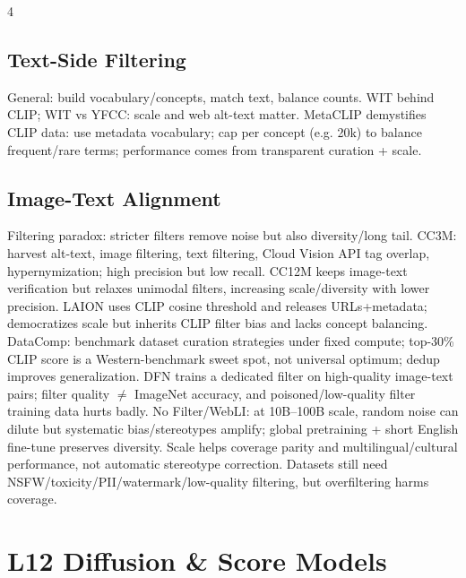 \documentclass[8pt,a4paper,landscape]{extarticle}
\begin{document}
\begin{multicols*}{4}
\subsection{Text-Side Filtering}
General: build vocabulary/concepts, match text, balance counts. WIT behind CLIP; WIT vs YFCC: scale and web alt-text matter. MetaCLIP demystifies CLIP data: use metadata vocabulary; cap per concept (e.g. 20k) to balance frequent/rare terms; performance comes from transparent curation + scale.
\subsection{Image-Text Alignment}
Filtering paradox: stricter filters remove noise but also diversity/long tail. CC3M: harvest alt-text, image filtering, text filtering, Cloud Vision API tag overlap, hypernymization; high precision but low recall. CC12M keeps image-text verification but relaxes unimodal filters, increasing scale/diversity with lower precision. LAION uses CLIP cosine threshold and releases URLs+metadata; democratizes scale but inherits CLIP filter bias and lacks concept balancing. DataComp: benchmark dataset curation strategies under fixed compute; top-30\% CLIP score is a Western-benchmark sweet spot, not universal optimum; dedup improves generalization. DFN trains a dedicated filter on high-quality image-text pairs; filter quality $\ne$ ImageNet accuracy, and poisoned/low-quality filter training data hurts badly. No Filter/WebLI: at 10B--100B scale, random noise can dilute but systematic bias/stereotypes amplify; global pretraining + short English fine-tune preserves diversity. Scale helps coverage parity and multilingual/cultural performance, not automatic stereotype correction. Datasets still need NSFW/toxicity/PII/watermark/low-quality filtering, but overfiltering harms coverage.

\section{L12 Diffusion \& Score Models}

\end{multicols*}
\end{document}
